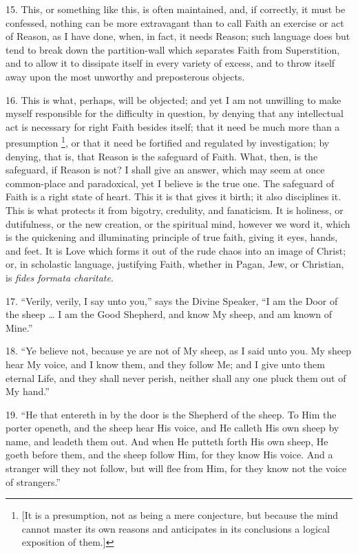 15. This, or something like this, is often maintained, and, if
correctly, it must be confessed, nothing can be more extravagant than
to call Faith an exercise or act of Reason, as I have done, when, in
fact, it needs Reason; such language does but tend to break down the
partition-wall which separates Faith from Superstition, and to allow
it to dissipate itself in every variety of excess, and to throw itself
away upon the most unworthy and preposterous objects.

16. This is what, perhaps, will be objected; and yet I am not
unwilling to make myself responsible for the difficulty in question,
by denying that any intellectual act is necessary for right Faith
besides itself; that it need be much more than a presumption \footnote{[It is a
presumption, not as being a mere conjecture, but because the mind
cannot master its own reasons and anticipates in its conclusions a
logical exposition of them.]}, or that it need be fortified and regulated by investigation;
by denying, that is, that Reason is the safeguard of Faith. What,
then, is the safeguard, if Reason is not? I shall give an answer,
which may seem at once common-place and paradoxical, yet I believe is
the true one. The safeguard of Faith is a right state of heart. This
it is that gives it birth; it also disciplines it. This is what
protects it from bigotry, credulity, and fanaticism. It is holiness,
or dutifulness, or the new creation, or the spiritual mind, however we
word it, which is the quickening and illuminating principle of true
faith, giving it eyes, hands, and feet. It is Love which forms it out
of the rude chaos into an image of Christ; or, in scholastic language,
justifying Faith, whether in Pagan, Jew, or Christian, is \emph{fides
formata charitate}.

17. ``Verily, verily, I say unto you,'' says the Divine
Speaker, ``I am the Door of the sheep … I am the Good Shepherd,
and know My sheep, and am known of Mine.''

18. ``Ye believe not, because ye are not of My sheep, as I said
unto you. My sheep hear My voice, and I know them, and they follow Me;
and I give unto them eternal Life, and they shall never perish,
neither shall any one pluck them out of My hand.''

19. ``He that entereth in by the door is the Shepherd of the
sheep. To Him the porter openeth, and the sheep hear His voice, and He
calleth His own sheep by name, and leadeth them out. And when He
putteth forth His own sheep, He goeth before them, and the sheep
follow Him, for they know His voice. And a stranger will they not
follow, but will flee from Him, for they know not the voice of
strangers.''

